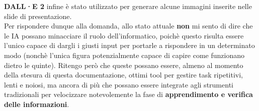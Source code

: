 \documentclass{article}
\begin{document}
        \textbf{DALL·E 2} infine è stato utilizzato per generare alcune immagini inserite nelle slide di presentazione.
        \newline\\
        Per rispondere dunque alla domanda, allo stato attuale \textbf{non} mi sento di dire che le IA possano minacciare il ruolo dell'informatico, poichè questo risulta essere l'unico capace di dargli i giusti input per portarle a rispondere in un determinato modo (nonchè l'unica figura potenzialmente capace di capire come funzionano dietro le quinte). Ritengo però che queste possano essere, almeno al momento della stesura di questa documentazione, ottimi tool per gestire task ripetitivi, lenti e noiosi, ma ancora di più che possano essere integrate agli strumenti tradizionali per velocizzare notevolemente la fase di \textbf{apprendimento e verifica delle informazioni}.
        
        
\end{document}
